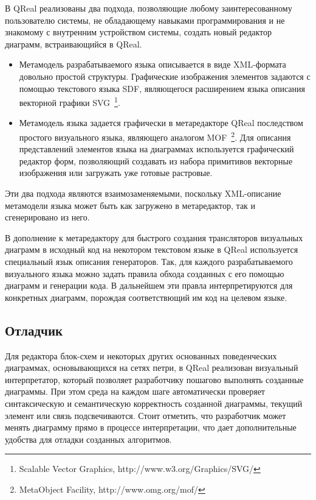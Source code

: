 \documentclass[a4paper]{article}
\begin{document}
В QReal реализованы два подхода, позволяющие любому заинтересованному пользователю системы, не обладающему навыками программирования и не знакомому с внутренним устройством системы, создать новый редактор диаграмм, встраивающийся в QReal.
\begin{itemize}
  \item Метамодель разрабатываемого языка описывается в виде XML-формата довольно простой структуры. Графические изображения элементов задаются с помощью текстового языка SDF, являющегося расширением языка описания векторной графики SVG~\footnote{Scalable Vector Graphics, http://www.w3.org/Graphics/SVG/}.
  \item Метамодель языка задается графически в метаредакторе QReal последством простого визуального языка, являющего аналогом MOF~\footnote{MetaObject Facility, http://www.omg.org/mof/}. Для описания представлений элементов языка на диаграммах используется графический редактор форм, позволяющий создавать из набора примитивов векторные изображения или загружать уже готовые растровые.
\end{itemize}
Эти два подхода являются взаимозаменяемыми, поскольку XML-описание метамодели языка может быть как загружено в метаредактор, так и сгенерировано из него. 

В дополнение к метаредактору для быстрого создания трансляторов визуальных диаграмм в исходный код на некотором текстовом языке в QReal используется специальный язык описания генераторов. Так, для каждого разрабатываемого визуального языка можно задать правила обхода созданных с его помощью диаграмм и генерации кода. В дальнейшем эти правла интерпретируются для конкретных диаграмм, порождая соответствющий им код на целевом языке.
  
\subsection{Отладчик}

Для редактора блок-схем и некоторых других основанных поведенческих диаграммах, основывающихся на сетях петри, в QReal реализован визуальный интерпретатор, который позволяет разработчику пошагово выполнять созданные диаграммы. При этом среда на каждом шаге автоматически проверяет синтаксическую и семантическую корректность созданной диаграммы, текущий элемент или связь подсвечиваются. Стоит отметить, что разработчик может менять диаграмму прямо в процессе интерпретации, что дает дополнительные удобства для отладки созданных алгоритмов. 
  
\end{document}
